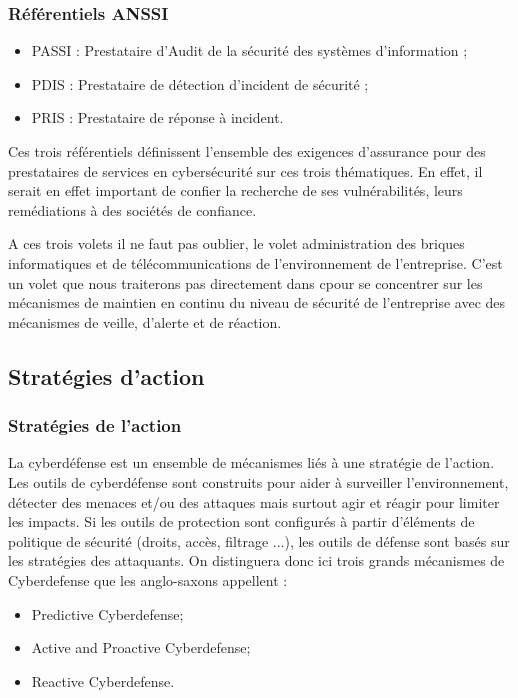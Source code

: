 \begin{frame}
\frametitle<presentation>{Référentiels ANSSI}
\begin{itemize}
\item PASSI : Prestataire d’Audit de la sécurité des systèmes d’information ;
\item PDIS : Prestataire de détection d’incident de sécurité ;
\item PRIS : Prestataire de réponse à incident.
\end{itemize}

Ces trois référentiels définissent l’ensemble des exigences d’assurance pour des prestataires de services en cybersécurité sur ces trois thématiques. En effet, il serait en effet important de confier la recherche de ses vulnérabilités, leurs remédiations à des sociétés de confiance. 
\end{frame}
A ces trois volets il ne faut pas oublier, le volet administration des briques informatiques et de télécommunications de l’environnement de l’entreprise. C’est un volet que nous traiterons pas directement dans c\edoc pour se concentrer sur les mécanismes de maintien en continu du niveau de sécurité de l’entreprise avec des mécanismes de veille, d’alerte et de réaction.


\subsection{Stratégies d'action}


\begin{frame}
\frametitle<presentation>{Stratégies de l'action}

La cyberdéfense est un ensemble de mécanismes liés à une stratégie de l'action. Les outils de cyberdéfense sont construits pour aider à surveiller l'environnement, détecter des menaces et/ou des attaques mais surtout agir et réagir pour limiter les impacts. Si les outils de protection sont configurés à partir d'éléments de politique de sécurité (droits, accès, filtrage ...), les outils de défense sont basés sur les stratégies des attaquants.
On distinguera donc ici trois grands mécanismes de Cyberdefense que les anglo-saxons appellent : 

\begin{itemize}
	\item Predictive Cyberdefense;
	\item Active and Proactive Cyberdefense;
	\item Reactive Cyberdefense.
\end{itemize}
\end{frame}

